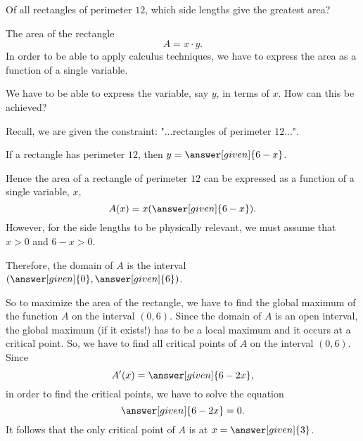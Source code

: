 \documentclass{ximera}
\begin{document}
\begin{example}
  Of all rectangles of perimeter $12$, which side lengths give the greatest area?
  
  \begin{image}
\end{image}

  \begin{explanation}
  The area of the rectangle
  \[
    A = x\cdot y.
    \]
   In order to be able to apply  calculus techniques,  we have to express the area as a function of a single variable.
   
    We have to be able to express the variable, say $y$, in terms of $x$. How can this be achieved?
    
  Recall, we are given the constraint: "...rectangles of perimeter $12$...".
  
    If a rectangle has perimeter $12$, then
     $y=\answer[given]{6-x}$.
     
    Hence the area of a rectangle of perimeter $12$ can be expressed as a function of a single variable, $x$,
    \[
    A(x) = x(\answer[given]{6-x}).
    \]
    However, for the side lengths to be physically relevant, we must
    assume that $x>0$ and $6-x>0$.
    
     Therefore, the domain of $A$ is  the interval
    $(\answer[given]{0},\answer[given]{6})$. 
      
    So to maximize the area of the rectangle, we have to find the global maximum of the function $A$ on the interval $(0,6)$.
   Since the domain of $A$ is an open interval, the global maximum (if it exists!) has to be a local maximum and it occurs at a critical point.
   So, we have to find all critical points of $A$ on the interval $(0,6)$.
    Since
    \[
    A'(x) = \answer[given]{6-2x},
    \]
   in order to find the critical points, we have to solve the equation
    \[
    \answer[given]{6-2x} = 0.
    \]
   It follows that the only critical point of $A$ is at $x=\answer[given]{3}$.
   

\end{explanation}
\end{example}
\end{document}
